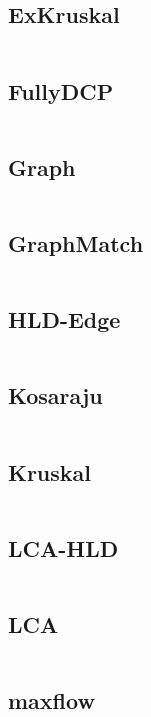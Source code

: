 \documentclass[a4]{article}
\begin{document}
\subsection{ExKruskal}
\inputminted[mathescape,linenos,numbersep=5pt,frame=lines,framesep=2mm]{cpp}{src/graph/ExKruskal.cpp}
\subsection{FullyDCP}
\inputminted[mathescape,linenos,numbersep=5pt,frame=lines,framesep=2mm]{cpp}{src/graph/FullyDCP.cpp}
\subsection{Graph}
\inputminted[mathescape,linenos,numbersep=5pt,frame=lines,framesep=2mm]{cpp}{src/graph/Graph.cpp}
\subsection{GraphMatch}
\inputminted[mathescape,linenos,numbersep=5pt,frame=lines,framesep=2mm]{cpp}{src/graph/GraphMatch.cpp}
\subsection{HLD-Edge}
\inputminted[mathescape,linenos,numbersep=5pt,frame=lines,framesep=2mm]{cpp}{src/graph/HLD-Edge.cpp}
\subsection{Kosaraju}
\inputminted[mathescape,linenos,numbersep=5pt,frame=lines,framesep=2mm]{cpp}{src/graph/Kosaraju.cpp}
\subsection{Kruskal}
\inputminted[mathescape,linenos,numbersep=5pt,frame=lines,framesep=2mm]{cpp}{src/graph/Kruskal.cpp}
\subsection{LCA-HLD}
\inputminted[mathescape,linenos,numbersep=5pt,frame=lines,framesep=2mm]{cpp}{src/graph/LCA-HLD.cpp}
\subsection{LCA}
\inputminted[mathescape,linenos,numbersep=5pt,frame=lines,framesep=2mm]{cpp}{src/graph/LCA.cpp}
\subsection{maxflow}
\inputminted[mathescape,linenos,numbersep=5pt,frame=lines,framesep=2mm]{cpp}{src/graph/maxflow.cpp}
\end{document}
